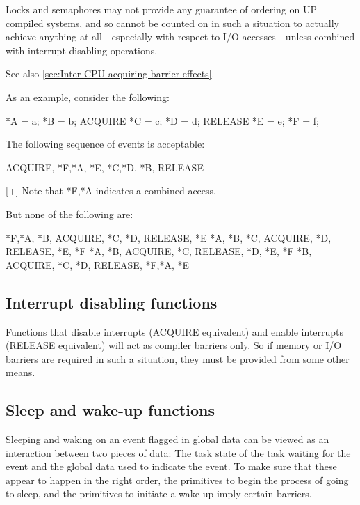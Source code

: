 Locks and semaphores may not provide any guarantee of ordering on UP compiled
systems, and so cannot be counted on in such a situation to actually achieve
anything at all---especially with respect to I/O accesses---unless combined
with interrupt disabling operations.

See also \cref{sec:Inter-CPU acquiring barrier effects}.


As an example, consider the following:

\begin{VerbatimU}
	*A = a;
	*B = b;
	ACQUIRE
	*C = c;
	*D = d;
	RELEASE
	*E = e;
	*F = f;
\end{VerbatimU}

The following sequence of events is acceptable:

\begin{VerbatimU}
	ACQUIRE, {*F,*A}, *E, {*C,*D}, *B, RELEASE

	[+] Note that {*F,*A} indicates a combined access.
\end{VerbatimU}

But none of the following are:

\begin{VerbatimU}
	{*F,*A}, *B,   ACQUIRE, *C, *D,   RELEASE, *E
	*A, *B, *C,    ACQUIRE, *D,       RELEASE, *E, *F
	*A, *B,        ACQUIRE, *C,       RELEASE, *D, *E, *F
	*B,            ACQUIRE, *C, *D,   RELEASE, {*F,*A}, *E
\end{VerbatimU}


\subsection{Interrupt disabling functions}

Functions that disable interrupts (ACQUIRE equivalent) and enable interrupts
(RELEASE equivalent) will act as compiler barriers only.
So if memory or I/O barriers are required in such a situation, they must be
provided from some other means.


\subsection{Sleep and wake-up functions}

Sleeping and waking on an event flagged in global data can be viewed as an
interaction between two pieces of data:
The task state of the task waiting for the event and the global data used
to indicate the event.
To make sure that these appear to happen in the right order, the primitives
to begin the process of going to sleep, and the primitives to initiate a
wake up imply certain barriers.

